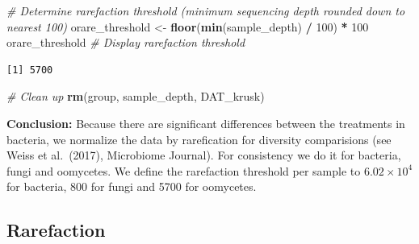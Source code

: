 \documentclass[
  11pt,
]{article}
\newenvironment{Shaded}{\begin{snugshade}}{\end{snugshade}}
\newcommand{\CommentTok}[1]{\textcolor[rgb]{0.56,0.35,0.01}{\textit{#1}}}
\newcommand{\DecValTok}[1]{\textcolor[rgb]{0.00,0.00,0.81}{#1}}
\newcommand{\FunctionTok}[1]{\textcolor[rgb]{0.13,0.29,0.53}{\textbf{#1}}}
\newcommand{\NormalTok}[1]{#1}
\newcommand{\OtherTok}[1]{\textcolor[rgb]{0.56,0.35,0.01}{#1}}
\newcommand{\SpecialCharTok}[1]{\textcolor[rgb]{0.81,0.36,0.00}{\textbf{#1}}}
\begin{document}
\begin{Shaded}
\begin{Highlighting}[]
\CommentTok{\# Determine rarefaction threshold (minimum sequencing depth rounded down to nearest 100)}
\NormalTok{orare\_threshold }\OtherTok{\textless{}{-}} \FunctionTok{floor}\NormalTok{(}\FunctionTok{min}\NormalTok{(sample\_depth) }\SpecialCharTok{/} \DecValTok{100}\NormalTok{) }\SpecialCharTok{*} \DecValTok{100}
\NormalTok{orare\_threshold  }\CommentTok{\# Display rarefaction threshold}
\end{Highlighting}
\end{Shaded}

\begin{verbatim}
[1] 5700
\end{verbatim}

\begin{Shaded}
\begin{Highlighting}[]
\CommentTok{\# Clean up}
\FunctionTok{rm}\NormalTok{(group, sample\_depth, DAT\_krusk)}
\end{Highlighting}
\end{Shaded}

\textbf{Conclusion:} Because there are significant differences between
the treatments in bacteria, we normalize the data by rarefication for
diversity comparisions (see Weiss et al.~(2017), Microbiome Journal).
For consistency we do it for bacteria, fungi and oomycetes. We define
the rarefaction threshold per sample to \ensuremath{6.02\times 10^{4}}
for bacteria, 800 for fungi and 5700 for oomycetes.

\subsection{Rarefaction}\label{rarefaction}
\end{document}
